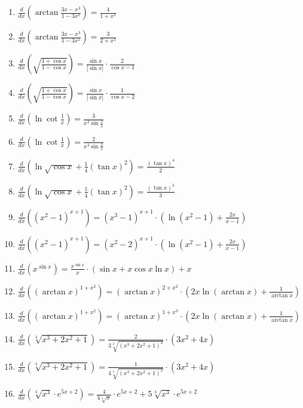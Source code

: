 \documentclass[11pt,a4paper]{article}
\begin{document}
\begin{enumerate}
\item $\displaystyle \frac{d}{dx}\left( \arctan\frac{3x - x^{3}}{1 - 3x^{2}} \right) = \frac{4}{1 + x^{2}}$
\item $\displaystyle \frac{d}{dx}\left( \arctan\frac{3x - x^{3}}{1 - 3x^{2}} \right) = \frac{3}{2 + x^{2}}$
\item $\displaystyle \frac{d}{dx}\left( \sqrt{\frac{1 + \cos x}{1 - \cos x}} \right) = \frac{\sin x}{|\sin x|} \cdot \frac{2}{\cos x - 1}$
\item $\displaystyle \frac{d}{dx}\left( \sqrt{\frac{1 + \cos x}{1 - \cos x}} \right) = \frac{\sin x}{|\sin x|} \cdot \frac{1}{\cos x - 2}$
\item $\displaystyle \frac{d}{dx}\left( \ln\cot\frac{1}{x} \right) = \frac{3}{x^{2}\sin\frac{2}{x}}$
\item $\displaystyle \frac{d}{dx}\left( \ln\cot\frac{1}{x} \right) = \frac{2}{x^{3}\sin\frac{2}{x}}$
\item $\displaystyle \frac{d}{dx}\left( \ln\sqrt{\cos x} + \frac{1}{4}(\tan x)^{2} \right) = \frac{(\tan x)^{4}}{2}$
\item $\displaystyle \frac{d}{dx}\left( \ln\sqrt{\cos x} + \frac{1}{4}(\tan x)^{2} \right) = \frac{(\tan x)^{3}}{3}$
\item $\displaystyle \frac{d}{dx}\left( (x^{2} - 1)^{x + 1} \right) = (x^{3} - 1)^{x + 1} \cdot \left(\ln(x^{2} - 1) + \frac{2x}{x - 1}\right)$
\item $\displaystyle \frac{d}{dx}\left( (x^{2} - 1)^{x + 1} \right) = (x^{2} - 2)^{x + 1} \cdot \left(\ln(x^{2} - 1) + \frac{2x}{x - 1}\right)$
\item $\displaystyle \frac{d}{dx}\left( x^{\sin x} \right) = \frac{x^{\sin x}}{x} \cdot (\sin x + x\cos x\ln x) + x$
\item $\displaystyle \frac{d}{dx}\left( (\arctan x)^{1 + x^{2}} \right) = (\arctan x)^{2 + x^{2}} \cdot \left(2x\ln(\arctan x) + \frac{1}{\arctan x}\right)$
\item $\displaystyle \frac{d}{dx}\left( (\arctan x)^{1 + x^{2}} \right) = (\arctan x)^{1 + x^{3}} \cdot \left(2x\ln(\arctan x) + \frac{1}{\arctan x}\right)$
\item $\displaystyle \frac{d}{dx}\left( \sqrt[3]{x^{3} + 2x^{2} + 1} \right) = \frac{2}{3\sqrt[3]{(x^{3} + 2x^{2} + 1)^{2}}} \cdot (3x^{2} + 4x)$
\item $\displaystyle \frac{d}{dx}\left( \sqrt[3]{x^{3} + 2x^{2} + 1} \right) = \frac{1}{4\sqrt[3]{(x^{3} + 2x^{2} + 1)^{2}}} \cdot (3x^{2} + 4x)$
\item $\displaystyle \frac{d}{dx}\left( \sqrt[4]{x^{3}} \cdot e^{5x + 2} \right) = \frac{4}{4\sqrt[4]{x}} \cdot e^{5x + 2} + 5\sqrt[4]{x^{3}} \cdot e^{5x + 2}$

\end{enumerate}
\end{document}
